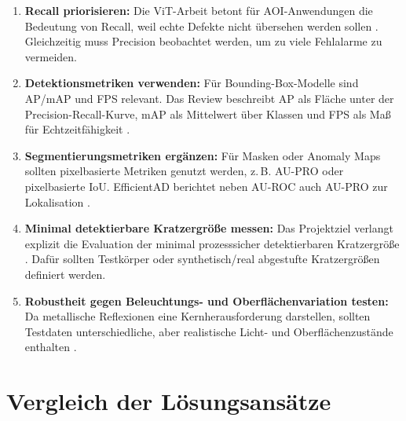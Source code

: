 \documentclass[11pt,a4paper]{article}
\begin{document}
\begin{enumerate}
    \item \textbf{Recall priorisieren:} Die ViT-Arbeit betont für AOI-Anwendungen die Bedeutung von Recall, weil echte Defekte nicht übersehen werden sollen \cite{vit_thesis}. Gleichzeitig muss Precision beobachtet werden, um zu viele Fehlalarme zu vermeiden.
    \item \textbf{Detektionsmetriken verwenden:} Für Bounding-Box-Modelle sind AP/mAP und FPS relevant. Das Review beschreibt AP als Fläche unter der Precision-Recall-Kurve, mAP als Mittelwert über Klassen und FPS als Maß für Echtzeitfähigkeit \cite{applications_review}.
    \item \textbf{Segmentierungsmetriken ergänzen:} Für Masken oder Anomaly Maps sollten pixelbasierte Metriken genutzt werden, z.\,B. AU-PRO oder pixelbasierte IoU. EfficientAD berichtet neben AU-ROC auch AU-PRO zur Lokalisation \cite{efficientad_results}.
    \item \textbf{Minimal detektierbare Kratzergröße messen:} Das Projektziel verlangt explizit die Evaluation der minimal prozesssicher detektierbaren Kratzergröße \cite{projektaufgabe}. Dafür sollten Testkörper oder synthetisch/real abgestufte Kratzergrößen definiert werden.
    \item \textbf{Robustheit gegen Beleuchtungs- und Oberflächenvariation testen:} Da metallische Reflexionen eine Kernherausforderung darstellen, sollten Testdaten unterschiedliche, aber realistische Licht- und Oberflächenzustände enthalten \cite{projektaufgabe}.
\end{enumerate}

\section{Vergleich der Lösungsansätze}
\end{document}
